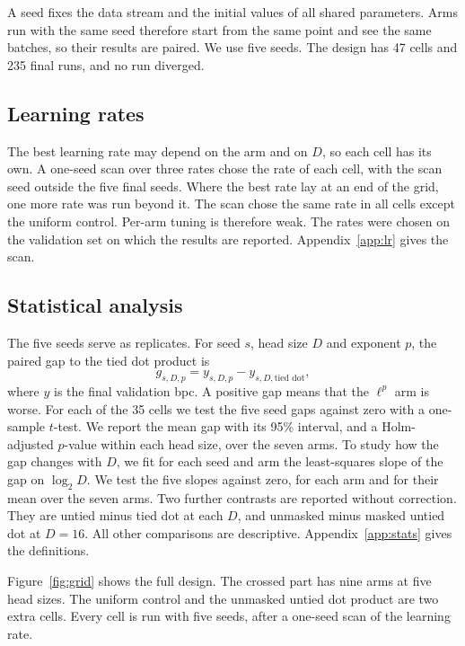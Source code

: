\documentclass[11pt]{article}
\begin{document}
A seed fixes the data stream and the initial values of all shared parameters.
Arms run with the same seed therefore start from the same point and see the same batches, so their results are paired.
We use five seeds.
The design has 47 cells and 235 final runs, and no run diverged.

\subsection{Learning rates}

The best learning rate may depend on the arm and on $D$, so each cell has its own.
A one-seed scan over three rates chose the rate of each cell, with the scan seed outside the five final seeds.
Where the best rate lay at an end of the grid, one more rate was run beyond it.
The scan chose the same rate in all cells except the uniform control.
Per-arm tuning is therefore weak.
The rates were chosen on the validation set on which the results are reported.
Appendix~\ref{app:lr} gives the scan.

\subsection{Statistical analysis}

The five seeds serve as replicates.
For seed $s$, head size $D$ and exponent $p$, the paired gap to the tied dot product is
\begin{equation}
g_{s,D,p}=y_{s,D,p}-y_{s,D,\text{tied dot}},
\end{equation}
where $y$ is the final validation bpc.
A positive gap means that the $\ell^p$ arm is worse.
For each of the 35 cells we test the five seed gaps against zero with a one-sample $t$-test.
We report the mean gap with its 95\% interval, and a Holm-adjusted $p$-value \citep{holm1979} within each head size, over the seven arms.
To study how the gap changes with $D$, we fit for each seed and arm the least-squares slope of the gap on $\log_2 D$.
We test the five slopes against zero, for each arm and for their mean over the seven arms.
Two further contrasts are reported without correction.
They are untied minus tied dot at each $D$, and unmasked minus masked untied dot at $D=16$.
All other comparisons are descriptive.
Appendix~\ref{app:stats} gives the definitions.

Figure~\ref{fig:grid} shows the full design.
The crossed part has nine arms at five head sizes.
The uniform control and the unmasked untied dot product are two extra cells.
Every cell is run with five seeds, after a one-seed scan of the learning rate.
\end{document}

